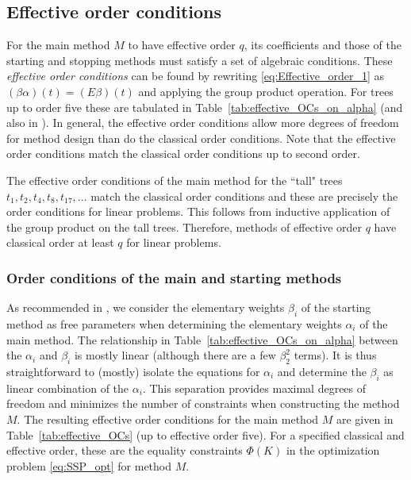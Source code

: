 \documentclass[final]{siamltex}  %
\begin{document}
\subsection{Effective order conditions}\label{sec:effOrderCond}
For the main method $M$ to have effective order $q$, its coefficients
and those of the starting and stopping methods must satisfy a set of
algebraic conditions.
These \emph{effective order conditions} can be found
by rewriting \eqref{eq:Effective_order_1} as
$(\beta\alpha)(t) = (E\beta)(t)$  %
and applying the group product operation.
For trees up to order five these are tabulated in Table~\ref{tab:effective_OCs_on_alpha} (and also in \cite[\S~389]{Butcher2008_book}).
In general, the effective order conditions allow more degrees of
freedom for method design than do the classical order conditions.
Note that the effective order conditions match the classical order conditions up to
second order.
\begin{remark}\label{rem:talltrees}
	The effective order conditions of the main method for the ``tall" trees 
	$t_1, t_2, t_4, t_8, t_{17}, \dots$ match the classical order conditions
	and these are precisely the order conditions for linear problems.
	This follows from inductive application of the group product
	on the tall trees. 
	Therefore, methods of effective order $q$ have classical order at least $q$ 
	for linear problems.
\end{remark}



\subsubsection{Order conditions of the main and starting methods}\label{subsubsec:Main_starting_conditions}
As recommended in \cite{Butcher2008_book},
we consider the elementary weights $\beta_{i}$ of the starting method as free
parameters when determining the elementary weights $\alpha_i$ of the main method.
The relationship in Table~\ref{tab:effective_OCs_on_alpha} between the
$\alpha_i$ and $\beta_i$ is mostly linear (although there are a few
$\beta_2^2$ terms).
It is thus straightforward to (mostly) isolate the equations for $\alpha_i$
and determine the $\beta_i$ as linear combination of the $\alpha_i$.
This separation provides maximal degrees of freedom and minimizes the number of
constraints when constructing the method $M$.
The resulting effective order conditions for the main method $M$ are given
in Table~\ref{tab:effective_OCs} (up to effective order five).
For a specified classical and effective order, these are the equality constraints
$\Phi(K)$ in the optimization problem \eqref{eq:SSP_opt} for method $M$.
\end{document}
